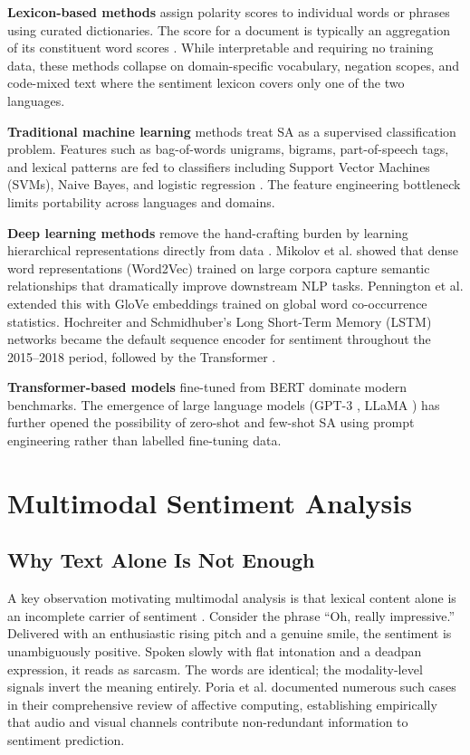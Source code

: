 \textbf{Lexicon-based methods} assign polarity scores to individual words or phrases using curated dictionaries. The score for a document is typically an aggregation of its constituent word scores \cite{cambria2016affective}. While interpretable and requiring no training data, these methods collapse on domain-specific vocabulary, negation scopes, and code-mixed text where the sentiment lexicon covers only one of the two languages.

\textbf{Traditional machine learning} methods treat SA as a supervised classification problem. Features such as bag-of-words unigrams, bigrams, part-of-speech tags, and lexical patterns are fed to classifiers including Support Vector Machines (SVMs), Naive Bayes, and logistic regression \cite{wankhade2022survey}. The feature engineering bottleneck limits portability across languages and domains.

\textbf{Deep learning methods} remove the hand-crafting burden by learning hierarchical representations directly from data \cite{lecun2015deep}. Mikolov et al. \cite{mikolov2013distributed} showed that dense word representations (Word2Vec) trained on large corpora capture semantic relationships that dramatically improve downstream NLP tasks. Pennington et al. \cite{pennington2014glove} extended this with GloVe embeddings trained on global word co-occurrence statistics. Hochreiter and Schmidhuber's \cite{hochreiter1997lstm} Long Short-Term Memory (LSTM) networks became the default sequence encoder for sentiment throughout the 2015--2018 period, followed by the Transformer \cite{vaswani2017attention}.

\textbf{Transformer-based models} fine-tuned from BERT \cite{devlin2019bert} dominate modern benchmarks. The emergence of large language models (GPT-3 \cite{brown2020gpt3}, LLaMA \cite{touvron2023llama}) has further opened the possibility of zero-shot and few-shot SA using prompt engineering rather than labelled fine-tuning data.

\section{Multimodal Sentiment Analysis}

\subsection{Why Text Alone Is Not Enough}

A key observation motivating multimodal analysis is that lexical content alone is an incomplete carrier of sentiment \cite{poria2017review}. Consider the phrase ``Oh, really impressive.'' Delivered with an enthusiastic rising pitch and a genuine smile, the sentiment is unambiguously positive. Spoken slowly with flat intonation and a deadpan expression, it reads as sarcasm. The words are identical; the modality-level signals invert the meaning entirely. Poria et al. \cite{poria2017review} documented numerous such cases in their comprehensive review of affective computing, establishing empirically that audio and visual channels contribute non-redundant information to sentiment prediction.

